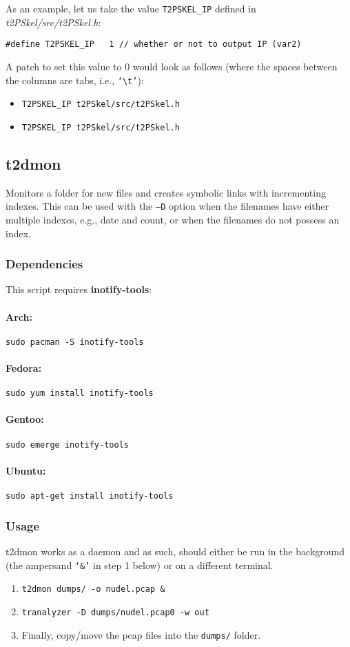 \documentclass[documentation]{subfiles}
\begin{document}
As an example, let us take the value {\tt T2PSKEL\_IP} defined in {\em t2PSkel/src/t2PSkel.h}:
\begin{center}
    {\tt \#define T2PSKEL\_IP~~~1 // whether or not to output IP (var2)}
\end{center}
A patch to set this value to 0 would look as follows (where the spaces between the columns are tabs, i.e., {\tt `\textbackslash{}t'}):
\begin{itemize}
    \item {\tt T2PSKEL\_IP   \qquad t2PSkel/src/t2PSkel.h}
    \item {\tt T2PSKEL\_IP  \qquad t2PSkel/src/t2PSkel.h}
\end{itemize}

\subsection{t2dmon}\label{t2dmon}
Monitors a folder for new files and creates symbolic links with incrementing indexes.
This can be used with the {\tt --D} option when the filenames have either multiple indexes, e.g., date and count, or when the filenames do not possess an index.

\subsubsection{Dependencies}
This script requires {\bf inotify-tools}:
\paragraph{Arch:} {\tt sudo pacman -S inotify-tools}
\paragraph{Fedora:} {\tt sudo yum install inotify-tools}
\paragraph{Gentoo:} {\tt sudo emerge inotify-tools}
\paragraph{Ubuntu:} {\tt sudo apt-get install inotify-tools}

\subsubsection{Usage}
t2dmon works as a daemon and as such, should either be run in the background (the ampersand {\tt `\&'} in step 1 below) or on a different terminal.
\begin{enumerate}
    \item {\tt t2dmon dumps/ -o nudel.pcap \&}
    \item {\tt tranalyzer -D dumps/nudel.pcap0 -w out}
    \item Finally, copy/move the pcap files into the {\tt dumps/} folder.
\end{enumerate}
\end{document}
